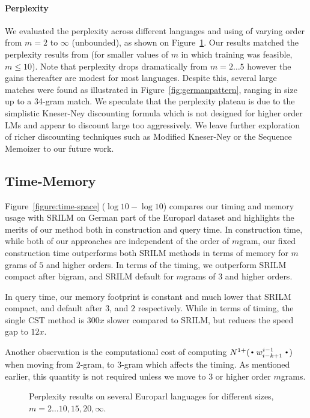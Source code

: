 \paragraph{Perplexity}
We evaluated the perplexity across different languages and using \ngrams of varying order from $m=2$ to $\infty$ (unbounded), as shown on Figure~\ref{figure:pplx}.
Our results matched the perplexity results from \SRILM (for smaller values of $m$ in which \SRILM training was feasible, $m \le 10$).
Note that perplexity drops dramatically from $m=2\ldots5$ however the gains thereafter are modest for most languages.
Despite this, several large \ngram matches were found as illustrated in Figure~\ref{fig:germanpattern}, ranging in size up to a 34-gram match.
We speculate that the perplexity plateau is due to the simplistic Kneser-Ney discounting formula which is not designed for higher order \ngram LMs and appear to discount large \ngrams too aggressively. 
We leave further exploration of richer discounting techniques such as Modified Kneser-Ney \cite{chen_goodman} or the Sequence Memoizer \cite{wood_teh} to our future work.

\subsection{Time-Memory}
Figure~\ref{figure:time-space} ($\log10-\log10$) compares our timing and memory usage with SRILM on German part of the Europarl dataset and highlights the merits of our method both in construction and query time. In construction time, while both of our approaches are independent of the order of $m$gram, our fixed construction time outperforms both SRILM methods in terms of memory for $m$grams of $5$ and higher orders. In terms of the timing, we outperform SRILM compact after bigram, and SRILM default for $m$grams of $3$ and higher orders.

In query time, our memory footprint is constant and much lower that SRILM compact, and default after $3$, and $2$ respectively. While in terms of timing, the single CST method is $300x$ slower compared to SRILM, but reduces the speed gap to $12x$.  

Another observation is the computational cost of computing $\nlplus{\Bigcdot w_{i-k+1}^{i-1} \Bigcdot}$ when moving from $2$-gram, to $3$-gram which affects the timing. As mentioned earlier, this quantity is not required unless we move to $3$ or higher order $m$grams.

\begin{figure}

\caption{Perplexity results on several Europarl languages for different \ngram sizes, $m=2\ldots10,15,20,\infty$.}
\label{figure:pplx}
\end{figure}

